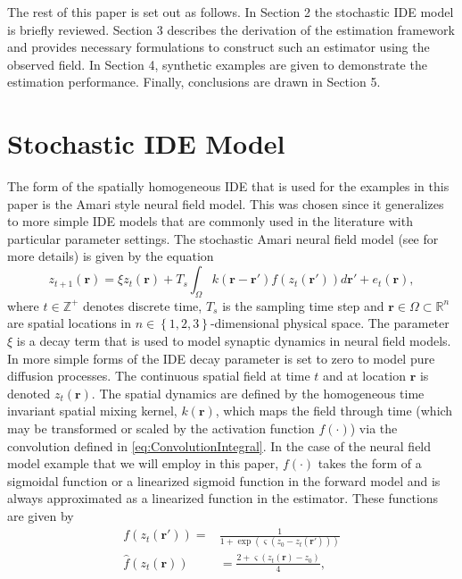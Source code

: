 \documentclass[10pt,twocolumn,twoside]{IEEEtran}
\begin{document}
The rest of this paper is set out as follows. In Section 2 the stochastic IDE model is briefly reviewed. Section 3 describes the derivation of the estimation framework and provides necessary formulations to construct such an estimator using the observed field. In Section 4, synthetic examples are given to demonstrate the estimation performance. Finally, conclusions are drawn in Section 5.

\section{Stochastic IDE Model}
The form of the spatially homogeneous IDE that is used for the examples in this paper is the Amari style neural field model. This was chosen since it generalizes to more simple IDE models that are commonly used in the literature with particular parameter settings. The stochastic Amari neural field model (see \cite{Freestone2011} for more details) is given by the equation  
\begin{equation}
 z_{t+1}\left(\mathbf{r}\right)=\xi z_t(\mathbf{r})+T_s\int_{\Omega}k\left(\mathbf{r}-\mathbf{r}'\right)f(z_{t}\left(\mathbf{r}'\right))d\mathbf{r}'+e_{t}\left(\mathbf{r}\right),
\label{eq:ConvolutionIntegral}
\end{equation}
where $t\in \mathbb{Z}^{+} $ denotes discrete time, $T_s$ is the sampling time step and $\mathbf{r} \in \Omega \subset \mathbb{R}^{n}$ are spatial locations in $n \in \left\lbrace 1,2,3 \right\rbrace $-dimensional physical space. The parameter $\xi$ is a decay term that is used to model synaptic dynamics in neural field models. In more simple forms of the IDE decay parameter is set to zero to model pure diffusion processes. The continuous spatial field at time $t$ and at location $\mathbf r$ is denoted $z_t\left(\mathbf r\right)$. The spatial dynamics are defined by the homogeneous time invariant spatial mixing kernel, $k\left(\mathbf{r}\right)$, which maps the field through time (which may be transformed or scaled by the activation function $f(\cdot)$) via the convolution defined in \eqref{eq:ConvolutionIntegral}. In the case of the neural field model example that we will employ in this paper, $f(\cdot)$ takes the form of a sigmoidal function or a linearized sigmoid function in the forward model and is always approximated as a linearized function in the estimator. These functions are given by
\begin{align}
	\label{ActivationFunction} f\left( z_t\left( \mathbf{r}'\right) \right) =& \frac{1}{1 + \exp \left( \varsigma \left( z_0 - z_t\left(\mathbf{r}'\right) \right) \right)} \\
	\hat{f}(z_t\left(\mathbf{r}\right)) &=\frac{2 + \varsigma(z_t\left(\mathbf{r}\right) - z_0)}{4}, 
\end{align}
\end{document}
